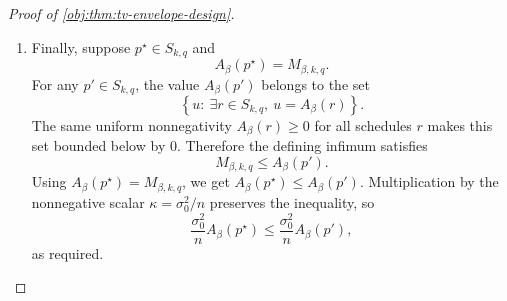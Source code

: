 \documentclass[11pt]{article}
\begin{document}
\begin{proof}[Proof of \cref{obj:thm:tv-envelope-design}]
\begin{enumerate}
\item
Finally, suppose \(p^\star\in S_{k,q}\) and
\[
A_\beta(p^\star)=M_{\beta,k,q}.
\]
For any \(p'\in S_{k,q}\), the value \(A_\beta(p')\) belongs to the set
\[
\left\{u:\ \exists r\in S_{k,q},\ u=A_\beta(r)\right\}.
\]
The same uniform nonnegativity \(A_\beta(r)\ge0\) for all schedules \(r\) makes this set bounded below by \(0\). Therefore the defining infimum satisfies
\[
M_{\beta,k,q}\le A_\beta(p').
\]
Using \(A_\beta(p^\star)=M_{\beta,k,q}\), we get \(A_\beta(p^\star)\le A_\beta(p')\). Multiplication by the nonnegative scalar \(\kappa=\sigma_0^2/n\) preserves the inequality, so
\[
\frac{\sigma_0^2}{n}A_\beta(p^\star)
\le
\frac{\sigma_0^2}{n}A_\beta(p'),
\]
as required. %
\end{enumerate}
\end{proof}
\end{document}
